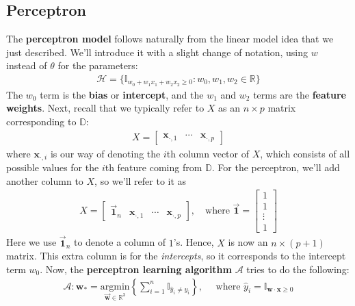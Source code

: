 \documentclass[12pt, a4paper]{article}
\theoremstyle{definition}
\begin{document}
	\subsection*{Perceptron}
	The \textbf{perceptron model} follows naturally from the linear model idea that we just
	described. We'll introduce it with a slight change of notation, using $w$ instead
	of $\theta$ for the parameters:
	\begin{align*}
		\mathcal{H} = \{\mathbb{I}_{w_0+w_1x_1+w_2x_2\geq 0}: w_0, w_1, w_2\in \mathbb{R}\}
	\end{align*}
	The $w_0$ term is the \textbf{bias} or \textbf{intercept}, and the $w_1$ and $w_2$ terms
	are the \textbf{feature weights}. Next, recall that we typically refer to $X$
	as an $n\times p$ matrix corresponding to $\mathbb{D}$:
	\begin{align*}
		X =\begin{bmatrix}
			\mathbf{x}_{\cdot, 1} & \cdots & \mathbf{x}_{\cdot, p}
		\end{bmatrix}
	\end{align*}
	where $\mathbf{x}_{\cdot, i}$ is our way of denoting the $i$th column vector of $X$,
	which consists of all possible values for the $i$th feature coming from $\mathbb{D}$.
	For the perceptron, we'll add another column to $X$, so we'll refer to it as
	\begin{align*}
		X = \begin{bmatrix}
			\vec{\mathbf{1}}_n & \mathbf{x}_{\cdot, 1} & \cdots & \mathbf{x}_{\cdot, p}
		\end{bmatrix},
		\quad \text{where }
		\vec{\mathbf{1}}=\begin{bmatrix}
			1\\
			1\\
			\vdots\\
			1
		\end{bmatrix}
	\end{align*}
	Here we use $\vec{\mathbf{1}}_n$ to denote a column of $1$'s.
	Hence, $X$ is now an $n\times (p+1)$ matrix. This extra column is for the \textit{intercepts},
	so it corresponds to the intercept term $w_0$. Now, the \textbf{perceptron learning algorithm}
	$\mathcal{A}$ tries to do the following:
	\begin{align*}
		\mathcal{A}: \mathbf{w}_{*}
		= \underset{\vec{\mathbf{w}}\in \mathbb{R}^3}{\text{argmin}}
		\left\{\sum_{i=1}^{n}\mathbb{I}_{\hat{y}_i\neq y_i}\right\},
		\quad
		\text{ where } \hat{y}_i = \mathbb{I}_{\mathbf{w}\cdot \mathbf{x}\geq 0}
	\end{align*}
\end{document}

